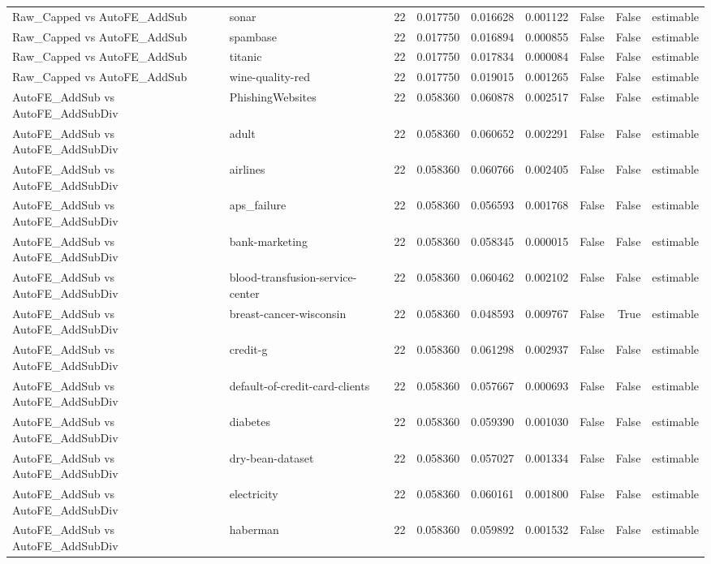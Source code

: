 \begin{table}
\begin{tabular}{llrrrrrrl}
Raw\_Capped vs AutoFE\_AddSub & sonar & 22 & 0.017750 & 0.016628 & 0.001122 & False & False & estimable \\
Raw\_Capped vs AutoFE\_AddSub & spambase & 22 & 0.017750 & 0.016894 & 0.000855 & False & False & estimable \\
Raw\_Capped vs AutoFE\_AddSub & titanic & 22 & 0.017750 & 0.017834 & 0.000084 & False & False & estimable \\
Raw\_Capped vs AutoFE\_AddSub & wine-quality-red & 22 & 0.017750 & 0.019015 & 0.001265 & False & False & estimable \\
AutoFE\_AddSub vs AutoFE\_AddSubDiv & PhishingWebsites & 22 & 0.058360 & 0.060878 & 0.002517 & False & False & estimable \\
AutoFE\_AddSub vs AutoFE\_AddSubDiv & adult & 22 & 0.058360 & 0.060652 & 0.002291 & False & False & estimable \\
AutoFE\_AddSub vs AutoFE\_AddSubDiv & airlines & 22 & 0.058360 & 0.060766 & 0.002405 & False & False & estimable \\
AutoFE\_AddSub vs AutoFE\_AddSubDiv & aps\_failure & 22 & 0.058360 & 0.056593 & 0.001768 & False & False & estimable \\
AutoFE\_AddSub vs AutoFE\_AddSubDiv & bank-marketing & 22 & 0.058360 & 0.058345 & 0.000015 & False & False & estimable \\
AutoFE\_AddSub vs AutoFE\_AddSubDiv & blood-transfusion-service-center & 22 & 0.058360 & 0.060462 & 0.002102 & False & False & estimable \\
AutoFE\_AddSub vs AutoFE\_AddSubDiv & breast-cancer-wisconsin & 22 & 0.058360 & 0.048593 & 0.009767 & False & True & estimable \\
AutoFE\_AddSub vs AutoFE\_AddSubDiv & credit-g & 22 & 0.058360 & 0.061298 & 0.002937 & False & False & estimable \\
AutoFE\_AddSub vs AutoFE\_AddSubDiv & default-of-credit-card-clients & 22 & 0.058360 & 0.057667 & 0.000693 & False & False & estimable \\
AutoFE\_AddSub vs AutoFE\_AddSubDiv & diabetes & 22 & 0.058360 & 0.059390 & 0.001030 & False & False & estimable \\
AutoFE\_AddSub vs AutoFE\_AddSubDiv & dry-bean-dataset & 22 & 0.058360 & 0.057027 & 0.001334 & False & False & estimable \\
AutoFE\_AddSub vs AutoFE\_AddSubDiv & electricity & 22 & 0.058360 & 0.060161 & 0.001800 & False & False & estimable \\
AutoFE\_AddSub vs AutoFE\_AddSubDiv & haberman & 22 & 0.058360 & 0.059892 & 0.001532 & False & False & estimable \\

\end{tabular}
\end{table}
